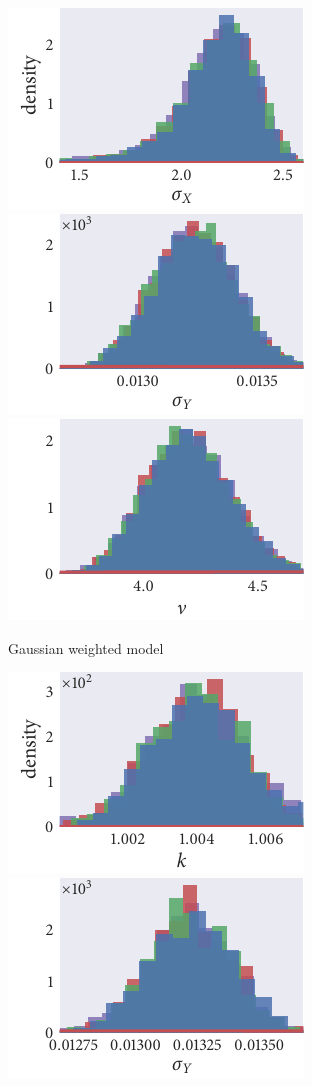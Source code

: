 \begin{figure}[p]
\begin{subfigure}[b]{\textwidth}
    \includegraphics{seq2/gauss_hist_sigma_X.pdf}%
    \includegraphics{seq2/gauss_hist_sigma_Y.pdf}%
    \includegraphics{seq2/gauss_hist_nu.pdf}
    \caption{Gaussian weighted model}
  \end{subfigure}
  \begin{subfigure}[b]{\textwidth}
    \includegraphics{seq2/top_hist_k.pdf}%
    \includegraphics{seq2/top_hist_sigma_Y.pdf}%

\end{subfigure}
\end{figure}
